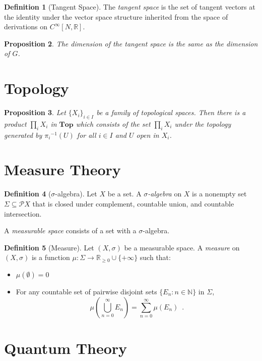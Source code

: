 \documentclass{book}
\newtheorem{prop}{Proposition}[chapter]
\theoremstyle{definition}
\newtheorem{df}[prop]{Definition}
\newcommand{\inv}[1]{\ensuremath{{#1}^{-1}}}
\begin{document}
\begin{df}[Tangent Space]
The \emph{tangent space} is the set of tangent vectors at the identity under the vector space structure inherited from the space of derivations on $C^\infty[N, \mathbb{R}]$.
\end{df}

\begin{prop}
The dimension of the tangent space is the same as the dimension of $G$.
\end{prop}


\part{Topology}

\begin{prop}
Let $\{ X_i \}_{i \in I}$ be a family of topological spaces. Then there is a product $\prod_i X_i$ in $\mathbf{Top}$ which consists of the set $\prod_i X_i$ under the topology generated by $\inv{\pi_i}(U)$ for all $i \in I$ and $U$ open in $X_i$.
\end{prop}

\part{Measure Theory}

\begin{df}[$\sigma$-algebra]
Let $X$ be a set. A \emph{$\sigma$-algebra} on $X$ is a nonempty set $\Sigma \subseteq \mathcal{P} X$ that is closed under complement, countable union, and countable intersection.

A \emph{measurable space} consists of a set with a $\sigma$-algebra.
\end{df}

\begin{df}[Measure]
Let $(X, \sigma)$ be a measurable space. A \emph{measure} on $(X, \sigma)$ is a function $\mu : \Sigma \rightarrow \mathbb{R}_{\geq 0} \cup \{ + \infty \}$ such that:
\begin{itemize}
\item $\mu(\emptyset) = 0$
\item For any countable set of pairwise disjoint sets $\{ E_n : n \in \mathbb{N} \}$ in $\Sigma$,
\[ \mu \left( \bigcup_{n=0}^\infty E_n \right) = \sum_{n=0}^\infty \mu(E_n) \enspace . \]
\end{itemize}
\end{df}

\part{Quantum Theory}
\end{document}

